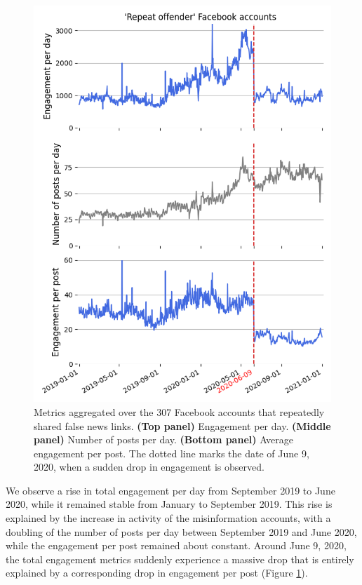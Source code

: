 \documentclass[11pt,a4paper]{article}
\begin{document}
\begin{figure}[!h]
\centering
\includegraphics[width=\linewidth]{./../figure/repeat_average_timeseries.png}
\caption{Metrics aggregated over the 307 Facebook accounts that repeatedly shared false news links. {\bf(Top panel)} Engagement per day. {\bf(Middle panel)} Number of posts per day. {\bf(Bottom panel)} Average engagement per post. The dotted line marks the date of June 9, 2020, when a sudden drop in engagement is observed.}
\label{repeat_average_timeseries}
\end{figure}

We observe a rise in total engagement per day from September 2019 to June 2020, while it remained stable from January to September 2019. 
This rise is explained by the increase in activity of the misinformation accounts, with a doubling of the number of posts per day between September 2019 and June 2020, while the engagement per post remained about constant.
Around June 9, 2020, the total engagement metrics suddenly experience a massive drop that is entirely explained by a corresponding drop in engagement per post (Figure \ref{repeat_average_timeseries}).
\end{document}
